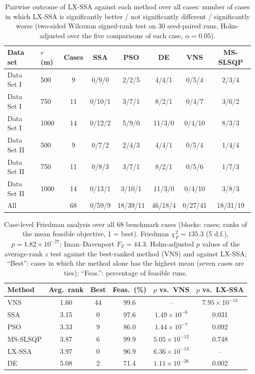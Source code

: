 \begin{table}[!t]
\centering
\caption{Pairwise outcome of LX-SSA against each method over all cases: number of cases in which LX-SSA is significantly better / not significantly different / significantly worse (two-sided Wilcoxon signed-rank test on 30 seed-paired runs, Holm-adjusted over the five comparisons of each case, $\alpha=0.05$).}
\label{tab:wtl}
\scriptsize\setlength{\tabcolsep}{2.5pt}
\begin{tabular}{llcccccc}
\toprule
Data set & $r$ (m) & Cases & SSA & PSO & DE & VNS & MS-SLSQP \\
\midrule
Data Set I & 500 & 9 & 0/9/0 & 2/2/5 & 4/4/1 & 0/5/4 & 2/3/4 \\
Data Set I & 750 & 11 & 0/10/1 & 3/7/1 & 8/2/1 & 0/4/7 & 3/6/2 \\
Data Set I & 1000 & 14 & 0/12/2 & 5/9/0 & 11/3/0 & 0/4/10 & 8/3/3 \\
Data Set II & 500 & 9 & 0/7/2 & 2/4/3 & 4/4/1 & 0/5/4 & 1/4/4 \\
Data Set II & 750 & 11 & 0/8/3 & 3/7/1 & 8/2/1 & 0/5/6 & 1/7/3 \\
Data Set II & 1000 & 14 & 0/13/1 & 3/10/1 & 11/3/0 & 0/4/10 & 3/8/3 \\
\midrule
All & & 68 & 0/59/9 & 18/39/11 & 46/18/4 & 0/27/41 & 18/31/19 \\
\bottomrule
\end{tabular}
\end{table}

\begin{table}[!t]
\centering
\caption{Case-level Friedman analysis over all 68 benchmark cases (blocks: cases; ranks of the mean feasible objective, 1 = best). Friedman $\chi^2_F=135.3$ (5 d.f.), $p=1.82\times10^{-27}$; Iman--Davenport $F_F=44.3$. Holm-adjusted $p$ values of the average-rank $z$ test against the best-ranked method (VNS) and against LX-SSA; ``Best'': cases in which the method alone has the highest mean (seven cases are ties); ``Feas.'': percentage of feasible runs.}
\label{tab:friedman68}
\scriptsize\setlength{\tabcolsep}{3pt}
\begin{tabular}{lccccc}
\toprule
Method & Avg.\ rank & Best & Feas.\ (\%) & $p$ vs.\ VNS & $p$ vs.\ LX-SSA \\
\midrule
VNS & 1.60 & 44 & 99.6 & -- & $7.95\times10^{-13}$ \\
SSA & 3.15 & 0 & 97.6 & $1.49\times10^{-6}$ & 0.031 \\
PSO & 3.33 & 9 & 86.0 & $1.44\times10^{-7}$ & 0.092 \\
MS-SLSQP & 3.87 & 6 & 99.9 & $5.05\times10^{-12}$ & 0.748 \\
LX-SSA & 3.97 & 0 & 96.9 & $6.36\times10^{-13}$ & -- \\
DE & 5.08 & 2 & 71.4 & $1.11\times10^{-26}$ & 0.002 \\
\bottomrule
\end{tabular}
\end{table}

